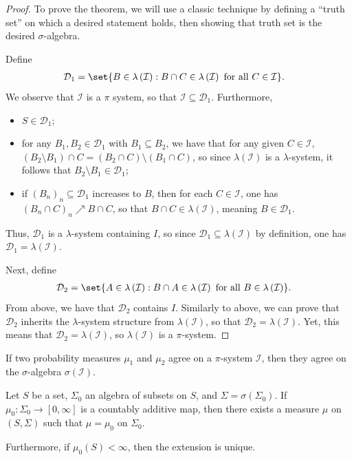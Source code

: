 \documentclass[10pt]{mypackage}
\begin{document}
\begin{proof}
  To prove the theorem, we will use a classic technique by defining a ``truth set'' on which a desired statement holds, then showing that truth set is the desired $\sigma$-algebra.

  Define
  \begin{align*}
    \mathcal{D}_1 &= \set{B\in \lambda\left( \mathcal{I} \right) : B\cap C\in \lambda\left( \mathcal{I} \right)\text{  for all }C\in \mathcal{I}}.
  \end{align*}
  We observe that $\mathcal{I}$ is a $\pi$ system, so that $\mathcal{I}\subseteq \mathcal{D}_1$. Furthermore, 
  \begin{itemize}
    \item $S\in \mathcal{D}_1$;
    \item for any $B_1,B_2\in \mathcal{D}_1$ with $B_1\subseteq B_2 $, we have that for any given $C\in \mathcal{I}$, $\left( B_2\setminus B_1 \right)\cap C = \left( B_2\cap C \right)\setminus \left( B_1\cap C \right)$, so since $\lambda\left( \mathcal{I} \right)$ is a $\lambda$-system, it follows that $B_2\setminus B_1\in \mathcal{D}_1$;
    \item if $\left( B_n \right)_n\subseteq \mathcal{D}_1$ increases to $B$, then for each $C\in \mathcal{I}$, one has $\left( B_n\cap C \right)_n\nearrow B\cap C$, so that $B\cap C\in \lambda\left( \mathcal{I} \right)$, meaning $B\in \mathcal{D}_1$.
  \end{itemize}
  Thus, $\mathcal{D}_1$ is a $\lambda$-system containing $I$, so since $\mathcal{D}_1\subseteq \lambda\left( \mathcal{I} \right)$ by definition, one has $\mathcal{D}_1 = \lambda\left( \mathcal{I} \right)$.

  Next, define
  \begin{align*}
    \mathcal{D}_2 &= \set{A\in \lambda\left( \mathcal{I} \right) : B\cap A\in \lambda\left( \mathcal{I} \right)\text{ for all }B\in \lambda\left( \mathcal{I} \right)}.
  \end{align*}
  From above, we have that $\mathcal{D}_2$ contains $I$. Similarly to above, we can prove that $\mathcal{D}_2$ inherits the $\lambda$-system structure from $\lambda\left( \mathcal{I} \right)$, so that $\mathcal{D}_2 = \lambda\left( \mathcal{I} \right)$. Yet, this means that $\mathcal{D}_2 = \lambda\left( \mathcal{I} \right)$, so $\lambda\left( \mathcal{I} \right)$ is a $\pi$-system.
\end{proof}
\begin{corollary}
  If two probability measures $\mu_1$ and $\mu_2$ agree on a $\pi$-system $\mathcal{I}$, then they agree on the $\sigma$-algebra $\sigma\left( \mathcal{I} \right)$.
\end{corollary}
\begin{theorem}
  Let $S$ be a set, $\Sigma_0$ an algebra of subsets on $S$, and $\Sigma = \sigma\left( \Sigma_0 \right)$. If $\mu_0\colon \Sigma_0\rightarrow [0,\infty]$ is a countably additive map, then there exists a measure $\mu$ on $\left( S,\Sigma \right)$ such that $\mu = \mu_0$ on $\Sigma_0$.

  Furthermore, if $\mu_0\left( S \right) < \infty$, then the extension is unique.
\end{theorem}
\end{document}
